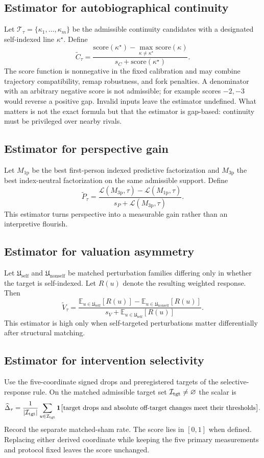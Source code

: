 \documentclass[11pt,a4paper]{article}
\theoremstyle{definition}
\newcommand{\ContField}{C}
\newcommand{\Persp}{P}
\newcommand{\ValAsym}{V}
\newcommand{\IntervProf}{\Delta}
\newcommand{\Loss}{\mathcal{L}}
\begin{document}
\subsection{Estimator for auto\-bio\-graphical continuity}
Let $\mathcal{T}_\tau=\{\kappa_1,\dots,\kappa_m\}$ be the admissible continuity candidates with a designated self-indexed line $\kappa^\star$. Define
\[
\widetilde{\ContField}_\tau
=
\frac{\mathrm{score}(\kappa^\star)-\max_{\kappa\neq \kappa^\star}\mathrm{score}(\kappa)}
{s_C+\mathrm{score}(\kappa^\star)}.
\]
The score function is nonnegative in the fixed calibration and may combine trajectory compatibility, remap robustness, and fork penalties. A denominator with an arbitrary negative score is not admissible; for example scores $-2,-3$ would reverse a positive gap. Invalid inputs leave the estimator undefined. What matters is not the exact formula but that the estimator is gap-based: continuity must be privileged over nearby rivals.

\subsection{Estimator for perspective gain}
Let $M_{\mathrm{1p}}$ be the best first-person indexed predictive factorization and $M_{\mathrm{3p}}$ the best index-neutral factorization on the same admissible support. Define
\[
\widetilde{\Persp}_\tau
=
\frac{\Loss(M_{\mathrm{3p}},\tau)-\Loss(M_{\mathrm{1p}},\tau)}
{s_P+\Loss(M_{\mathrm{3p}},\tau)}.
\]
This estimator turns perspective into a measurable gain rather than an interpretive flourish.

\subsection{Estimator for valuation asymmetry}
Let $\mathfrak{U}_{\mathrm{self}}$ and $\mathfrak{U}_{\mathrm{nonself}}$ be matched perturbation families differing only in whether the target is self-indexed. Let $R(u)$ denote the resulting weighted response. Then
\[
\widetilde{\ValAsym}_\tau
=
\frac{\mathbb{E}_{u\in\mathfrak{U}_{\mathrm{self}}}[R(u)]-
\mathbb{E}_{u\in\mathfrak{U}_{\mathrm{nonself}}}[R(u)]}
{s_V+\mathbb{E}_{u\in\mathfrak{U}_{\mathrm{self}}}[R(u)]}.
\]
This estimator is high only when self-targeted perturbations matter differentially after structural matching.

\subsection{Estimator for intervention selectivity}
Use the five-coordinate signed drops and preregistered targets of the selective-response rule. On the matched admissible target set $\mathcal I_{\rm tgt}\ne\varnothing$ the scalar is
\[
 \widehat{\IntervProf}_\tau =
 \frac{1}{|\mathcal I_{\rm tgt}|}\sum_{u\in\mathcal I_{\rm tgt}}
 {\bf1}\bigl[\text{target drops and absolute off-target changes meet their thresholds}\bigr].
\]
Record the separate matched-sham rate. The score lies in $[0,1]$ when defined. Replacing either derived coordinate while keeping the five primary measurements and protocol fixed leaves the score unchanged.
\end{document}
